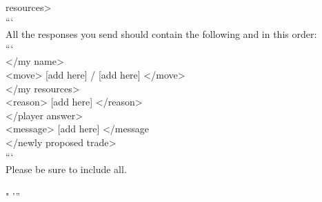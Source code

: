 \begin{codebox}[title= Prompts for Ultimatum]
resources>\\```\\All the responses you send should contain the following and in this order:\\```\\<my name> [add here] </my name>\\<move> [add here] / [add here]  </move> \\<my resources> [add here] </my resources>\\<reason> [add here] </reason>\\<player answer> [add here] </player answer>\\<message> [add here] </message\\<newly proposed trade> [add here] </newly proposed trade>\\```\\Please be sure to include all.\\\\"
'''
\end{codebox}



